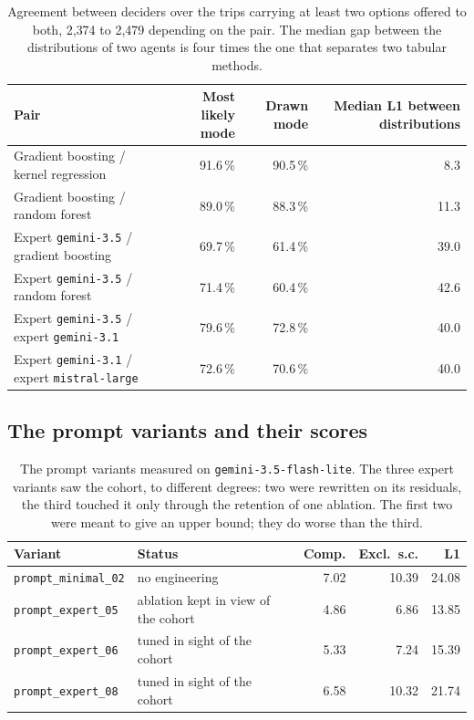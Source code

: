 \begin{table}[tp]
  \caption{Agreement between deciders over the trips carrying at least two options offered to both, 2{,}374 to 2{,}479 depending on the pair. The median gap between the distributions of two agents is four times the one that separates two tabular methods.}
  \label{tab:agreement-full}
  \small
  \setlength{\tabcolsep}{4pt}
  \begin{tabular}{@{}lrrr@{}}
    \toprule
    Pair & Most likely mode & Drawn mode & Median L1 between distributions \\
    \midrule
    Gradient boosting / kernel regression & 91.6\,\% & 90.5\,\% & 8.3 \\
    Gradient boosting / random forest     & 89.0\,\% & 88.3\,\% & 11.3 \\
    \midrule
    Expert \texttt{gemini-3.5} / gradient boosting & 69.7\,\% & 61.4\,\% & 39.0 \\
    Expert \texttt{gemini-3.5} / random forest     & 71.4\,\% & 60.4\,\% & 42.6 \\
    Expert \texttt{gemini-3.5} / expert \texttt{gemini-3.1}    & 79.6\,\% & 72.8\,\% & 40.0 \\
    Expert \texttt{gemini-3.1} / expert \texttt{mistral-large} & 72.6\,\% & 70.6\,\% & 40.0 \\
    \bottomrule
  \end{tabular}
\end{table}

\subsection{The prompt variants and their scores}

\begin{table}[tp]
  \caption{The prompt variants measured on \texttt{gemini-3.5-flash-lite}. The three expert variants saw the cohort, to different degrees: two were rewritten on its residuals, the third touched it only through the retention of one ablation. The first two were meant to give an upper bound; they do worse than the third.}
  \label{tab:variants}
  \small
  \setlength{\tabcolsep}{5pt}
  \begin{tabular}{@{}llrrr@{}}
    \toprule
    Variant & Status & Comp. & Excl.\ s.c. & L1 \\
    \midrule
    \texttt{prompt\_minimal\_02} & no engineering        & 7.02 & 10.39 & 24.08 \\
    \texttt{prompt\_expert\_05}  & ablation kept in view of the cohort & 4.86 &  6.86 & 13.85 \\
    \texttt{prompt\_expert\_06}  & tuned in sight of the cohort & 5.33 & 7.24 & 15.39 \\
    \texttt{prompt\_expert\_08}  & tuned in sight of the cohort & 6.58 & 10.32 & 21.74 \\
    \bottomrule
  \end{tabular}
\end{table}

